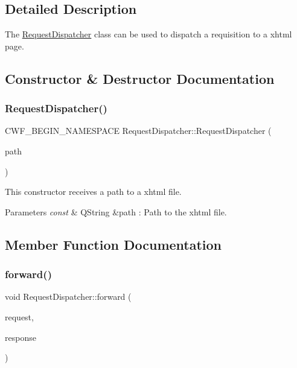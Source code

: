 \subsection{Detailed Description}
The \mbox{\hyperlink{class_request_dispatcher}{Request\+Dispatcher}} class can be used to dispatch a requisition to a xhtml page. 

\subsection{Constructor \& Destructor Documentation}
\mbox{\label{class_request_dispatcher_accb486106fd9d814d44222594a174fbb}} 
\subsubsection{\texorpdfstring{Request\+Dispatcher()}{RequestDispatcher()}}
{\footnotesize\ttfamily C\+W\+F\+\_\+\+B\+E\+G\+I\+N\+\_\+\+N\+A\+M\+E\+S\+P\+A\+CE Request\+Dispatcher\+::\+Request\+Dispatcher (\begin{DoxyParamCaption}\item[{const Q\+String \&}]{path }\end{DoxyParamCaption})\hspace{0.3cm}{\ttfamily [explicit]}}



This constructor receives a path to a xhtml file. 


\begin{DoxyParams}{Parameters}
{\em const} & Q\+String \&path \+: Path to the xhtml file. \\
\hline
\end{DoxyParams}


\subsection{Member Function Documentation}
\mbox{\label{class_request_dispatcher_aa3ccc7d3debc6555da0f6e437cfb036e}} 
\subsubsection{\texorpdfstring{forward()}{forward()}}
{\footnotesize\ttfamily void Request\+Dispatcher\+::forward (\begin{DoxyParamCaption}\item[{C\+W\+F\+::\+Http\+Servlet\+Request \&}]{request,  }\item[{C\+W\+F\+::\+Http\+Servlet\+Response \&}]{response }\end{DoxyParamCaption})}



